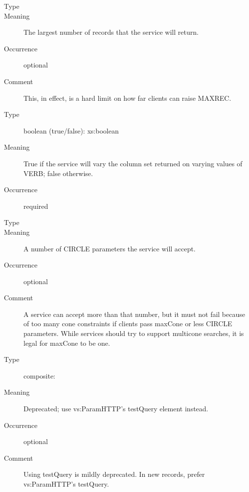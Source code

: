 \documentclass[11pt,a4paper]{ivoa}
\begin{document}
\begin{generated}
\begin{bigdescription}
\begin{description}
\end{description}
\item[Element \xmlel{maxRecords}]
\begin{description}
\item[Type] 
\item[Meaning] The largest number of records that the service will
                        return.
\item[Occurrence] optional
\item[Comment] This, in effect, is a hard limit on how far clients
                        can raise MAXREC.

\end{description}
\item[Element \xmlel{verbosity}]
\begin{description}
\item[Type] boolean (true/false): xs:boolean
\item[Meaning] True if the service will vary the column set
                        returned on varying values of VERB;
                        false otherwise.
\item[Occurrence] required

\end{description}
\item[Element \xmlel{maxCone}]
\begin{description}
\item[Type] 
\item[Meaning] A number of CIRCLE parameters the service will
                        accept.
\item[Occurrence] optional
\item[Comment] A service can accept more than that number, but it
                        must not fail because of too many cone constraints
                        if clients pass maxCone or less CIRCLE parameters.
                        While services should try to support multicone
                        searches, it is legal for maxCone to be one.

\end{description}
\item[Element \xmlel{testQuery}]
\begin{description}
\item[Type] composite: 
\item[Meaning] Deprecated; use vs:ParamHTTP's testQuery element
                        instead.
\item[Occurrence] optional
\item[Comment] Using testQuery is mildly deprecated.  In new
                        records, prefer vs:ParamHTTP's testQuery.

\end{description}


\end{bigdescription}\endgroup

\endgroup
\end{generated}
\end{document}
